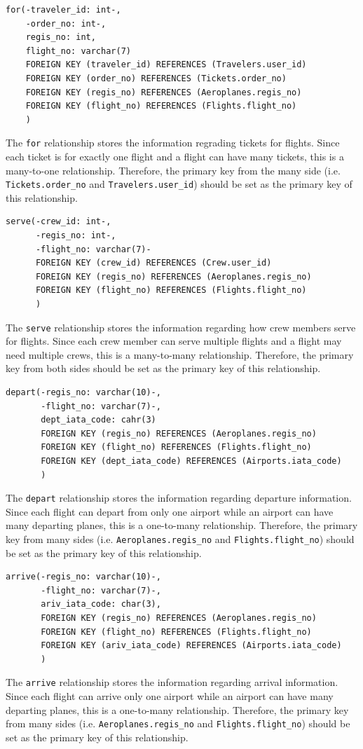 \documentclass{article}
\begin{document}
	\begin{lstlisting}[keepspaces=true]
for(-traveler_id: int-, 
    -order_no: int-,
    regis_no: int, 
    flight_no: varchar(7)
    FOREIGN KEY (traveler_id) REFERENCES (Travelers.user_id)
    FOREIGN KEY (order_no) REFERENCES (Tickets.order_no)
    FOREIGN KEY (regis_no) REFERENCES (Aeroplanes.regis_no)
    FOREIGN KEY (flight_no) REFERENCES (Flights.flight_no)
    )
	\end{lstlisting}    
	The \texttt{for} relationship stores the information regrading tickets for flights. Since each ticket is for exactly one flight and a flight can have many tickets, this is a many-to-one relationship. Therefore, the primary key from the many side (i.e. \texttt{Tickets.order\_no} and \texttt{Travelers.user\_id}) should be set as the primary key of this relationship.

	\begin{lstlisting}[keepspaces=true]        
serve(-crew_id: int-, 
      -regis_no: int-, 
      -flight_no: varchar(7)-
      FOREIGN KEY (crew_id) REFERENCES (Crew.user_id)
      FOREIGN KEY (regis_no) REFERENCES (Aeroplanes.regis_no)
      FOREIGN KEY (flight_no) REFERENCES (Flights.flight_no)
      )
	\end{lstlisting}    
	The \texttt{serve} relationship stores the information regarding how crew members serve for flights. Since each crew member can serve multiple flights and a flight may need multiple crews, this is a many-to-many relationship. Therefore, the primary key from both sides should be set as the primary key of this relationship.

	\begin{lstlisting}[keepspaces=true] 
depart(-regis_no: varchar(10)-,
       -flight_no: varchar(7)-,
       dept_iata_code: cahr(3)
       FOREIGN KEY (regis_no) REFERENCES (Aeroplanes.regis_no)
       FOREIGN KEY (flight_no) REFERENCES (Flights.flight_no)
       FOREIGN KEY (dept_iata_code) REFERENCES (Airports.iata_code)
       )
	\end{lstlisting}    
	The \texttt{depart} relationship stores the information regarding departure information. Since each flight can depart from only one airport while an airport can have many departing planes, this is a one-to-many relationship. Therefore, the primary key from many sides (i.e. \texttt{Aeroplanes.regis\_no} and \texttt{Flights.flight\_no}) should be set as the primary key of this relationship.

	\begin{lstlisting}[keepspaces=true]
arrive(-regis_no: varchar(10)-,
       -flight_no: varchar(7)-, 
       ariv_iata_code: char(3),
       FOREIGN KEY (regis_no) REFERENCES (Aeroplanes.regis_no)
       FOREIGN KEY (flight_no) REFERENCES (Flights.flight_no)
       FOREIGN KEY (ariv_iata_code) REFERENCES (Airports.iata_code)
       )
	\end{lstlisting}    
	The \texttt{arrive} relationship stores the information regarding arrival information. Since each flight can arrive only one airport while an airport can have many departing planes, this is a one-to-many relationship. Therefore, the primary key from many sides (i.e. \texttt{Aeroplanes.regis\_no} and \texttt{Flights.flight\_no}) should be set as the primary key of this relationship.
\end{document}
